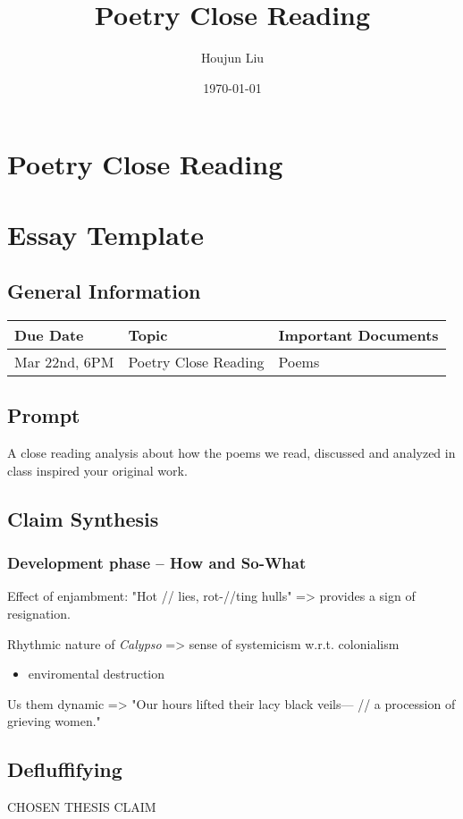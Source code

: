 \documentclass[letterpaper]{article}
\author{Houjun Liu}
\date{\today}
\title{Poetry Close Reading}
\renewcommand{\tableofcontents}{}
\begin{document}
\tableofcontents



\section{Poetry Close Reading}
\label{sec:org1aea35b}
\section{Essay Template}
\label{sec:org681bffb}
\subsection{General Information}
\label{sec:orgf5244ca}
\begin{center}
\begin{tabular}{lll}
Due Date & Topic & Important Documents\\
\hline
Mar 22nd, 6PM & Poetry Close Reading & Poems\\
\end{tabular}
\end{center}

\subsection{Prompt}
\label{sec:org560d9ff}
A close reading analysis about how the poems we read, discussed and
analyzed in class inspired your original work.

\subsection{Claim Synthesis}
\label{sec:org5ab2b5a}
\subsubsection{Development phase -- How and So-What}
\label{sec:orgd7f5e90}
Effect of enjambment: "Hot // lies, rot-//ting hulls" => provides a sign
of resignation.

Rhythmic nature of \emph{Calypso} => sense of systemicism w.r.t. colonialism
\begin{itemize}
\item enviromental destruction
\end{itemize}

Us them dynamic => "Our hours lifted their lacy black veils--- // a
procession of grieving women."

\subsection{Defluffifying}
\label{sec:org6b9b71b}
CHOSEN THESIS CLAIM
\end{document}
